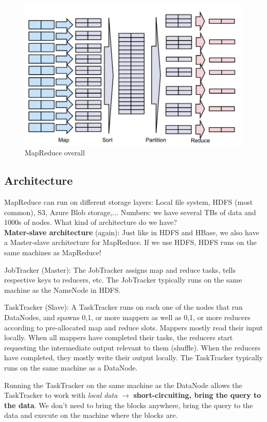 \documentclass[11pt,oneside,a4paper]{article}
\begin{document}
\begin{figure}[t!]
	\centering
	\includegraphics[width=0.4\linewidth]{figures/mr_overall}
	\caption{MapReduce overall}
	\label{fig:mroverall}
\end{figure}

\subsection{Architecture}

MapReduce can run on different storage layers: Local file system, HDFS (most common), S3, Azure Blob storage,... Numbers: we have several TBs of data and 1000s of nodes. What kind of architecture do we have?\\

\textbf{Mater-slave architecture} (again): Just like in HDFS and HBase, we also have a Master-slave architecture for MapReduce. If we use HDFS, HDFS runs on the same machines as MapReduce!
\begin{compactitem}
\item JobTracker (Master): The JobTracker assigns map and reduce tasks, tells respective keys to reducers, etc. The JobTracker typically runs on the same machine as the NameNode in HDFS.

\item TaskTracker (Slave): A TaskTracker runs on each one of the nodes that run DataNodes, and spawns 0,1, or more mappers as well as 0,1, or more reducers according to pre-allocated map and reduce slots. Mappers mostly read their input locally. When all mappers have completed their tasks, the reducers start requesting the intermediate output relevant to them (shuffle). When the reducers have completed, they mostly write their output locally. The TaskTracker typically runs on the same machine as a DataNode.
\end{compactitem}

Running the TaskTracker on the same machine as the DataNode allows the TaskTracker to work with \textit{local data} $\rightarrow$ \textbf{short-circuiting, bring the query to the data}. We don't need to bring the blocks anywhere, bring the query to the data and execute on the machine where the blocks are.\\
\end{document}
